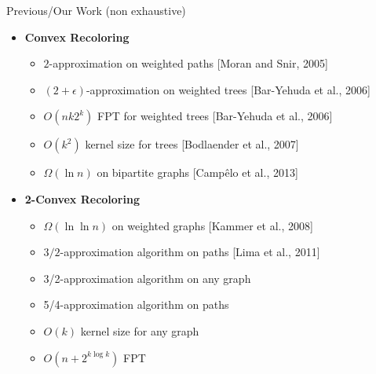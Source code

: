 \def\refsize{\tiny}

\begin{frame}{Previous/\alert{Our} Work (non exhaustive)}
\begin{itemize}
\item
\textbf{Convex Recoloring}
\begin{itemize}

\pause\item
$2$-approximation on weighted paths 
{\refsize[Moran and Snir, 2005]}

\pause\item
$(2 + \epsilon)$-approximation on weighted trees 
{\refsize[Bar-Yehuda et al., 2006]}

\pause\item
$O(n k 2^{k})$ FPT for weighted trees
{\refsize[Bar-Yehuda et al., 2006]}

\pause\item
$O(k^2)$ kernel size for trees
{\refsize[Bodlaender et al., 2007]}

\pause\item
$\Omega(\ln{n})$ on bipartite graphs
{\refsize[Camp\^elo et al., 2013]}


\end{itemize}
\pause\item
\textbf{2-Convex Recoloring}
\begin{itemize}


\pause\item
$\Omega(\ln\ln{n})$ on weighted graphs
{\refsize[Kammer et al., 2008]}

\pause\item
$3/2$-approximation algorithm on paths
{\refsize[Lima et al., 2011]}

\pause\item
\alert{3/2-approximation algorithm on any graph}

\pause\item
\alert{5/4-approximation algorithm on paths}

\pause\item
\alert{$O(k)$ kernel size for any graph}

\pause\item
\alert{$O(n + 2^{k\log k})$ FPT}



\end{itemize}
\end{itemize}
\end{frame}